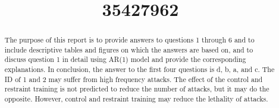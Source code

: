 \documentclass[a4paper, 12pt]{article}
\title{\textbf{35427962}}
\author{}
\date{}
\numberwithin{equation}{section}
\theoremstyle{definition}
\theoremstyle{remark}
\begin{document}
\maketitle
\begin{abstract}
The purpose of this report is to provide answers to questions 1 through 6 and to include descriptive tables and figures on which the answers are based on, and to discuss question 1 in detail using AR(1) model and provide the corresponding explanations. In conclusion, the answer to the first four questions is d, b, a, and c. The ID of 1 and 2 may suffer from high frequency attacks. The effect of the control and restraint training is not predicted to reduce the number of attacks, but it may do the opposite. However, control and restraint training may reduce the lethality of attacks.
\end{abstract}













\clearpage


\end{document}
